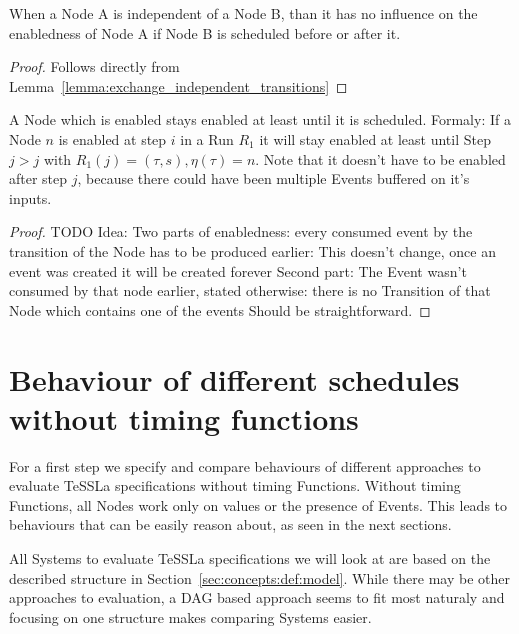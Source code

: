 \begin{lemma}[name = Influence of independent Nodes]\label{lemma:independent_nodes}
  When a Node A is independent of a Node B, than it has no influence on the enabledness of Node A if Node B is scheduled before or after it.
\end{lemma}

\begin{proof}
  Follows directly from Lemma~\ref{lemma:exchange_independent_transitions}
\end{proof}

\begin{lemma}[name = Duration of Enabledness]\label{lemma:enabled_till_scheduled}
  A Node which is enabled stays enabled at least until it is scheduled.
  Formaly: If a Node \(n\) is enabled at step \(i\) in a Run \(R_1\) it will stay enabled at least until Step \(j > j\) with \(R_1(j) = (\tau,s), \eta(\tau) = n\).
  Note that it doesn't have to be enabled after step \(j\), because there could have been multiple Events buffered on it's inputs.
\end{lemma}

\begin{proof}
TODO Idea: Two parts of enabledness: every consumed event by the transition of the Node has to be produced earlier: This doesn't change, once an event was created it will be created forever
Second part: The Event wasn't consumed by that node earlier, stated otherwise: there is no Transition of that Node which contains one of the events
Should be straightforward.
\end{proof}


\section{Behaviour of different schedules without timing functions}
\label{sec:concepts:behaviour_without_timing}

For a first step we specify and compare behaviours of different approaches to evaluate TeSSLa specifications without timing Functions.
Without timing Functions, all Nodes work only on values or the presence of Events.
This leads to behaviours that can be easily reason about, as seen in the next sections.

All Systems to evaluate TeSSLa specifications we will look at are based on the described structure in Section~\ref{sec:concepts:def:model}.
While there may be other approaches to evaluation, a DAG based approach seems to fit most naturaly and focusing on one structure makes comparing Systems easier.

